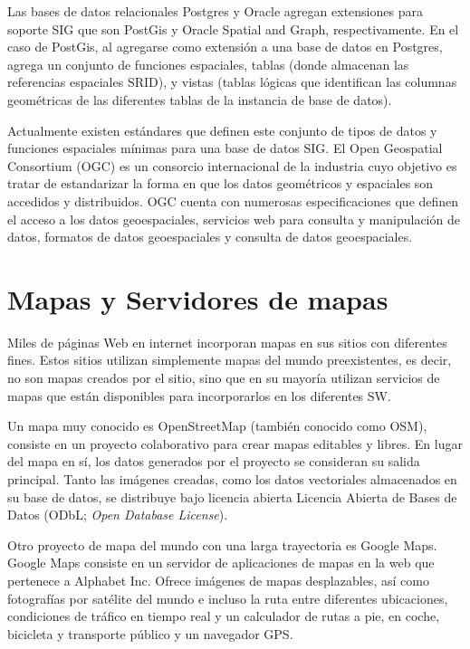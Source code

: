 Las bases de datos relacionales Postgres y Oracle agregan extensiones para soporte SIG que son PostGis y Oracle Spatial and Graph, respectivamente. En el caso de PostGis, al agregarse como extensión a una base de datos en Postgres, agrega un conjunto de funciones espaciales, tablas (donde almacenan las referencias espaciales SRID), y vistas (tablas lógicas que identifican las columnas geométricas de las diferentes tablas de la instancia de base de datos).

Actualmente existen estándares que definen este conjunto de tipos de datos y funciones espaciales mínimas para una base de datos SIG. El Open Geospatial Consortium (OGC) es un consorcio internacional de la industria cuyo objetivo es tratar de estandarizar la forma en que los datos geométricos y espaciales son accedidos y distribuidos. OGC cuenta con numerosas especificaciones que definen el acceso a los datos geoespaciales, servicios web para consulta y manipulación de datos, formatos de datos geoespaciales y consulta de datos geoespaciales.

\section{Mapas y Servidores de mapas}

Miles de páginas Web en internet incorporan mapas en sus sitios con diferentes fines. Estos sitios utilizan simplemente mapas del mundo preexistentes, es decir, no son mapas creados por el sitio, sino que en su mayoría utilizan servicios de mapas que están disponibles para incorporarlos en los diferentes SW.

Un mapa muy conocido es OpenStreetMap (también conocido como OSM), consiste en un proyecto colaborativo para crear mapas editables y libres. En lugar del mapa en sí, los datos generados por el proyecto se consideran su salida principal. Tanto las imágenes creadas, como los datos vectoriales almacenados en su base de datos, se distribuye bajo licencia abierta Licencia Abierta de Bases de Datos (ODbL; \textit{Open Database License}).

Otro proyecto de mapa del mundo con una larga trayectoria es Google Maps. Google Maps consiste en un servidor de aplicaciones de mapas en la web que pertenece a Alphabet Inc. Ofrece imágenes de mapas desplazables, así como fotografías por satélite del mundo e incluso la ruta entre diferentes ubicaciones, condiciones de tráfico en tiempo real y un calculador de rutas a pie, en coche, bicicleta y transporte público y un navegador GPS.

